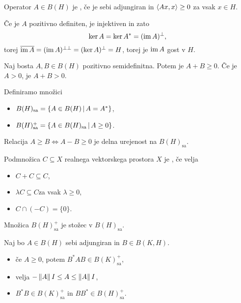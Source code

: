 \begin{definicija}
  Operator $A \in B(H)$ je , če je sebi
  adjungiran in $\left< Ax,x \right> \ge 0$ za vsak $x \in H$.
\end{definicija}

\begin{opomba}
  Če je $A$ pozitivno definiten, je injektiven in zato
  \[
	\operatorname{ker} A = \operatorname{ker} A^* = (\operatorname{im} A)^\bot,
  \]
  torej $\overline{\operatorname{im} A} = (\operatorname{im} A)^{\bot \bot} = (\operatorname{ker} A)^\bot = H$,
  torej je $\operatorname{im} A$ gost v $H$.
\end{opomba}

\begin{lema}
  Naj bosta $A, B \in B(H)$ pozitivno semidefinitna.
  Potem je $A+B \ge 0$.
  Če je $A > 0$, je $A+B > 0$.
\end{lema}

Definiramo množici
\begin{itemize}
\item $B(H)_{\text{sa}} = \{ A \in B(H) \,|\, A = A^* \}$,
\item $B(H)_{\text{sa}}^+ = \{ A \in B(H)_{\text{sa}} \,|\, A \ge 0 \}$.
\end{itemize}

\begin{trditev}
  Relacija $A \ge B \iff A-B \ge 0$ je delna urejenost na $B(H)_{\text{sa}}$.
\end{trditev}

\begin{definicija}
  Podmnožica $C \subseteq X$ realnega vektorskega prostora $X$ je
  , če velja
  \begin{itemize}
  \item $C + C \subseteq C$,
  \item $\lambda C \subseteq C$za vsak $\lambda \ge 0$,
  \item $C \cap (-C) = \{0\}$.
  \end{itemize}
\end{definicija}

\begin{trditev}
  Množica $B(H)_{\text{sa}}^+$ je stožec v $B(H)_{\text{sa}}$.
\end{trditev}

\begin{trditev}
  Naj bo $A \in B(H)$ sebi adjungiran in $B \in B(K,H)$.
  \begin{itemize}
  \item če $A \ge 0$, potem $B^* A B \in B(K)_{\text{sa}}^+$,
  \item velja $-\left\lVert A\right\rVert I \le A \le \left\lVert A\right\rVert I$,
  \item $B^* B \in B(K)_{\text{sa}}^+$ in $BB^* \in B(H)_{\text{sa}}^+$.
  \end{itemize}
\end{trditev}

